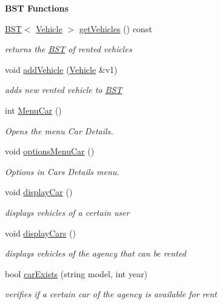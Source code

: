 \begin{Indent}\textbf{ B\+ST Functions}\par
\begin{DoxyCompactItemize}
\item 
\hyperlink{class_b_s_t}{B\+ST}$<$ \hyperlink{class_vehicle}{Vehicle} $>$ \hyperlink{group___agency_gaf7b06f6c289c6c6a7acf09dda8a6f7d5}{get\+Vehicles} () const
\begin{DoxyCompactList}\small\item\em returns the \hyperlink{class_b_s_t}{B\+ST} of rented vehicles \end{DoxyCompactList}\item 
void \hyperlink{group___agency_gab2a08b75fbe909173d539d27a06c7bc9}{add\+Vehicle} (\hyperlink{class_vehicle}{Vehicle} \&v1)
\begin{DoxyCompactList}\small\item\em adds new rented vehicle to \hyperlink{class_b_s_t}{B\+ST} \end{DoxyCompactList}\item 
int \hyperlink{group___agency_ga1273a762d40c0519e9382238341fa579}{Menu\+Car} ()
\begin{DoxyCompactList}\small\item\em Opens the menu Car Details. \end{DoxyCompactList}\item 
void \hyperlink{group___agency_gaba16b0f3b2db9c70e5a54eef91e0765d}{options\+Menu\+Car} ()
\begin{DoxyCompactList}\small\item\em Options in Cars Details menu. \end{DoxyCompactList}\item 
void \hyperlink{group___agency_ga9416585f65eeab4b7ac1071d5d4de036}{display\+Car} ()
\begin{DoxyCompactList}\small\item\em displays vehicles of a certain user \end{DoxyCompactList}\item 
void \hyperlink{group___agency_gac6f2e6884260af2dfedb7cd6f3360996}{display\+Cars} ()
\begin{DoxyCompactList}\small\item\em displays vehicles of the agency that can be rented \end{DoxyCompactList}\item 
bool \hyperlink{group___agency_ga3332e859279fb7f7ff27916c4b6b6ca3}{car\+Exists} (string model, int year)
\begin{DoxyCompactList}\small\item\em verifies if a certain car of the agency is available for rent \end{DoxyCompactList}\item 

\end{DoxyCompactItemize}
\end{Indent}
